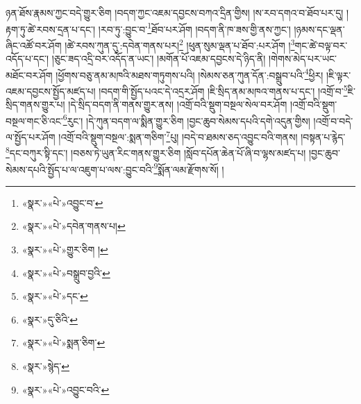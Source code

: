 ཉན་ཐོས་རྣམས་ཀྱང་བདེ་གྱུར་ཅིག །བདག་ཀྱང་འཇམ་དབྱངས་བཀའ་དྲིན་གྱིས། །ས་རབ་དགའ་བ་ཐོབ་པར་དུ། །རྟག་ཏུ་ཚེ་རབས་དྲན་པ་དང་། །རབ་ཏུ་:བྱུང་བ་\footnote{«སྣར་»«པེ་»འབྱུང་བ་}ཐོབ་པར་ཤོག །བདག་ནི་ཁ་ཟས་གྱི་ནས་ཀྱང་། །ཉམས་དང་ལྡན་ཞིང་འཚོ་བར་ཤོག །ཚེ་རབས་ཀུན་དུ་:དབེན་གནས་པར།\footnote{«སྣར་»«པེ་»དབེན་གནས་པ།} །ཕུན་སུམ་ལྡན་པ་ཐོབ་:པར་ཤོག །\footnote{«སྣར་»«པེ་»གྱུར་ཅིག །}གང་ཚེ་བལྟ་བར་འདོད་པ་དང་། །ཅུང་ཟད་འདྲི་བར་འདོད་ན་ཡང་། །མགོན་པོ་འཇམ་དབྱངས་དེ་ཉིད་ནི། །གེགས་མེད་པར་ཡང་མཐོང་བར་ཤོག །ཕྱོགས་བཅུ་ནམ་མཁའི་མཐས་གཏུགས་པའི། །སེམས་ཅན་ཀུན་དོན་:བསྒྲུབ་པའི་\footnote{«སྣར་»«པེ་»བསྒྲུབ་བྱའི་}ཕྱིར། །ཇི་ལྟར་འཇམ་དབྱངས་སྤྱོད་མཛད་པ། །བདག་གི་སྤྱོད་པའང་དེ་འདྲར་ཤོག །ཇི་སྲིད་ནམ་མཁའ་གནས་པ་དང་། །འགྲོ་བ་\footnote{«སྣར་»«པེ་»དང་}ཇི་སྲིད་གནས་གྱུར་པ། །དེ་སྲིད་བདག་ནི་གནས་གྱུར་ནས། །འགྲོ་བའི་སྡུག་བསྔལ་སེལ་བར་ཤོག །འགྲོ་བའི་སྡུག་བསྔལ་གང་ཅི་འང་\footnote{«སྣར་»དུ་ཅིའི་}རུང་། །དེ་ཀུན་བདག་ལ་སྨིན་གྱུར་ཅིག །བྱང་ཆུབ་སེམས་དཔའི་དགེ་འདུན་གྱིས། །འགྲོ་བ་བདེ་ལ་སྤྱོད་པར་ཤོག །འགྲོ་བའི་སྡུག་བསྔལ་:སྨན་གཅིག་\footnote{«སྣར་»«པེ་»སྨན་ཅིག་}པུ། །བདེ་བ་ཐམས་ཅད་འབྱུང་བའི་གནས། །བསྟན་པ་རྙེད་\footnote{«སྣར་»སྙེད་}དང་བཀུར་སྟི་དང་། །བཅས་ཏེ་ཡུན་རིང་གནས་གྱུར་ཅིག །སློབ་དཔོན་ཆེན་པོ་ཞི་བ་ལྷས་མཛད་པ། །བྱང་ཆུབ་སེམས་དཔའི་སྤྱོད་པ་ལ་འཇུག་པ་ལས་:བྱུང་བའི་\footnote{«སྣར་»«པེ་»འབྱུང་བའི་}སྨོན་ལམ་རྫོགས་སོ། ། 